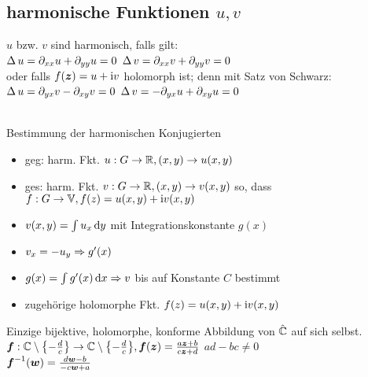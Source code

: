 \documentclass[german,color]{latex4ei/latex4ei_fs}
\begin{document}
\begin{sectionbox}
	\subsection{harmonische Funktionen $u,v$}
	$u$ bzw. $v$ sind harmonisch, falls gilt:\\
	$\operatorname{\Delta} u = \partial_{xx} u + \partial_{yy} u = 0$ \qquad\quad $\operatorname{\Delta} v = \partial_{xx} v + \partial_{yy} v = 0$\\[0.5em]
	oder falls $f(\boldsymbol{z}) = u + \mathrm{i} v$ holomorph ist; denn mit Satz von Schwarz:\\
	$\operatorname{\Delta} u = \partial_{yx} v - \partial_{xy} v = 0$ \qquad\quad $\operatorname{\Delta} v = - \partial_{yx} u + \partial_{xy} u = 0$\\
	\\
	\begin{cookbox}{Bestimmung der harmonischen Konjugierten}
		\begin{itemize}
			\item geg: harm. Fkt. $u: G \rightarrow \mathbb R, (x,y) \rightarrow u(x,y)$
			\item ges: harm. Fkt. $v: G \rightarrow \mathbb R, (x,y) \rightarrow v(x,y)$
			so, dass $f: G \rightarrow \mathbb V, f(z) = u(x,y) + \mathrm{i} v (x,y)$
			\item $v(x,y) = \int u_x \diff y$ mit Integrationskonstante $g(x)$
			\item $v_x = -u_y \Rightarrow g'(x)$
			\item $g(x) = \int g'(x) \diff x \Ra v$ bis auf Konstante $C$ bestimmt
			\item zugehörige holomorphe Fkt.
			$f (z) = u (x,y) + \mathrm{i} v(x,y)$
		\end{itemize}
	\end{cookbox}
\end{sectionbox}

\begin{sectionbox}
	Einzige bijektive, holomorphe, konforme Abbildung von $\hat {\mathbb C}$ auf sich selbst.\\
	$\boldsymbol{f}:\mathbb C \setminus \bigl\{-\frac{d}{c}\bigr\} \rightarrow \mathbb C \setminus \bigl\{-\frac{d}{c}\bigr\}, \boldsymbol{f}(\boldsymbol{z}) = \frac{a\boldsymbol{z} + b}{c\boldsymbol{z} + d}$ \qquad $ad - bc \ne 0$\\ 
	$\boldsymbol{f}^{-1}(\boldsymbol{w}) = \frac{d\boldsymbol{w} - b}{-c \boldsymbol{w} + a}$
\end{sectionbox}
\end{document}

